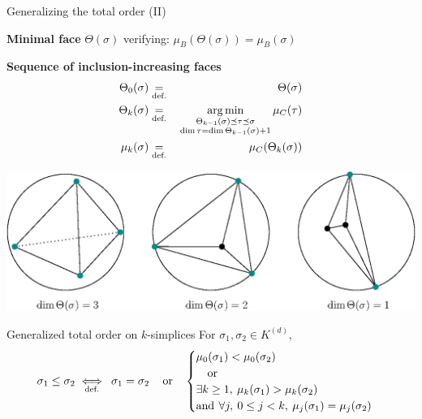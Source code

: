\begin{frame}{Generalizing the total order (II)}
	\scriptsize
	
	\begin{minipage}{0.6\linewidth}
		\textbf{Minimal face} $\Theta(\sigma)$ verifying: $\mu_B(\Theta(\sigma)) = \mu_B(\sigma)$
		
		\textbf{Sequence of inclusion-increasing faces}
		\begin{eqnarray*}
			\Theta_0(\sigma) & \underset{\text{def.}}{=} \: & \Theta(\sigma) \\
			\Theta_k(\sigma) & \underset{\text{def.}}{=} \: & \operatorname*{arg\,min}_{\substack{\Theta_{k-1}(\sigma) \preceq \tau 	\preceq \sigma\\ \dim{\tau} = \dim{\Theta_{k-1}(\sigma) + 1}}} \mu_C(\tau) \\
			\mu_k(\sigma) &\underset{\text{def.}}{=} \:& \mu_C(\Theta_{k}(\sigma))
		\end{eqnarray*}
	\end{minipage}%
	\begin{minipage}{0.4\linewidth}
		\centering
		\includegraphics[width=0.95\linewidth]{theta_for_tetra}
	\end{minipage}

	\begin{block}{\scriptsize Generalized total order on $k$-simplices} For $\sigma_1, \sigma_2 \in K^{(d)}$, \[
			\sigma_1 \leq \sigma_2  
			\underset{\text{def.}}{\iff} \:
			\sigma_1 = \sigma_2 \quad \operatorname{or} \quad
			\begin{cases}
				\mu_{0}(\sigma_1) < \mu_{0}(\sigma_2) &\\
				\quad \operatorname{or} &\\
				\exists k\geq 1, \: \mu_{k}(\sigma_1) > \mu_{k}(\sigma_2) &\\ 
				\operatorname{and} \: \forall j, \: 0\leq j < k, \: \mu_{j}(\sigma_1) = \mu_{j}(\sigma_2) &
			\end{cases}
		\]
	\end{block}
\end{frame}

